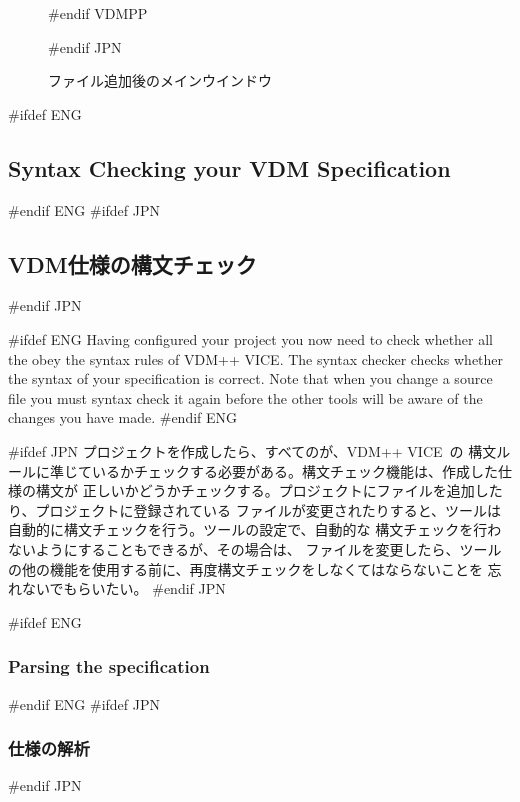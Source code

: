 \documentclass[\pformat,12pt]{article}
\newcommand{\vdmslpp}{VDM-SL}
\newcommand{\vdmslpp}{VDM++}
\renewcommand{\vdmslpp}{VDM++ VICE}
\begin{document}
\begin{figure}[tbh]
\begin{center}
#endif VDMPP
\caption{ファイル追加後のメインウインドウ}
#endif JPN
\label{fig:addedfiles}
\end{center}
\end{figure}


#ifdef ENG
\subsection{Syntax Checking your VDM Specification}
#endif ENG
#ifdef JPN
\subsection{VDM仕様の構文チェック} 
#endif JPN

#ifdef ENG
Having configured your project you now need to check whether all the
 obey the syntax rules
of \vdmslpp.  The syntax checker checks whether the syntax of your
specification is correct. Note that when you change a source file you
must syntax check it again before the other tools will be aware of the
changes you have made.
#endif ENG

#ifdef JPN
プロジェクトを作成したら、すべてのが、\vdmslpp\ の
構文ルールに準じているかチェックする必要がある。構文チェック機能は、作成した仕様の構文が
正しいかどうかチェックする。プロジェクトにファイルを追加したり、プロジェクトに登録されている
ファイルが変更されたりすると、ツールは自動的に構文チェックを行う。ツールの設定で、自動的な
構文チェックを行わないようにすることもできるが、その場合は、
ファイルを変更したら、ツールの他の機能を使用する前に、再度構文チェックをしなくてはならないことを
忘れないでもらいたい。
#endif JPN

#ifdef ENG
\subsubsection{Parsing the specification}
#endif ENG
#ifdef JPN
\subsubsection{仕様の解析}
#endif JPN
\end{document}
